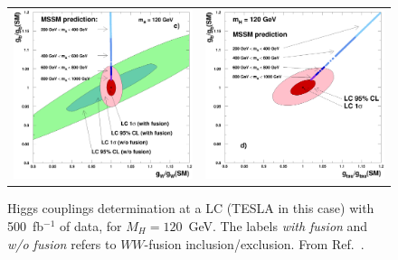\documentclass[11pt,prd,onecolumn,aps,floats,superscriptaddress,floatfix,nofootinbib]{revtex4-2}
\begin{document}
\begin{figure}
\begin{tabular}{cc}
\begin{minipage}{0.5\linewidth}
{\includegraphics[scale=0.4]{fig2206c}}
\end{minipage} &
\begin{minipage}{0.5\linewidth}
{\includegraphics[scale=0.4]{fig2206d}}
\end{minipage}
\end{tabular}
\caption[]{Higgs couplings determination at a LC (TESLA in this case) with 500~fb$^{-1}$ of
data, for $M_H\!=\!120$~GeV. The labels \emph{with fusion} and
\emph{w/o fusion} refers to $WW$-fusion inclusion/exclusion. From
Ref.~\cite{Aguilar-Saavedra:2001rg}. \label{fig:higgs_couplings_lc}}
\end{figure}
\end{document}
